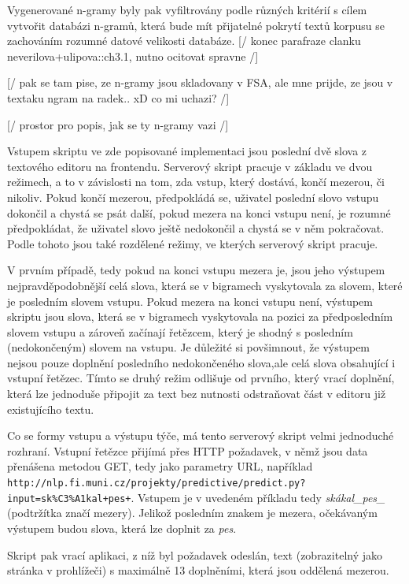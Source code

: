 \documentclass{article}
\begin{document}
Vygenerované n-gramy byly pak vyfiltrovány podle různých kritérií s cílem vytvořit databázi n-gramů, která bude mít přijatelné pokrytí textů korpusu se zachováním rozumné datové velikosti databáze.
[/ konec parafraze clanku neverilova+ulipova::ch3.1, nutno ocitovat spravne /]

[/ pak se tam pise, ze n-gramy jsou skladovany v FSA, ale mne prijde, ze jsou v textaku ngram na radek.. xD co mi uchazi? /]

[/ prostor pro popis, jak se ty n-gramy vazi /]

Vstupem skriptu ve zde popisované implementaci jsou poslední dvě slova z textového editoru na frontendu. Serverový skript pracuje v základu ve dvou režimech, a to v závislosti na tom, zda vstup, který dostává, končí mezerou, či nikoliv. Pokud končí mezerou, předpokládá se, uživatel poslední slovo vstupu dokončil a chystá se psát další, pokud mezera na konci vstupu není, je rozumné předpokládat, že uživatel slovo ještě nedokončil a chystá se v něm pokračovat. Podle tohoto jsou také rozdělené režimy, ve kterých serverový skript pracuje. 

V prvním případě, tedy pokud na konci vstupu mezera je, jsou jeho výstupem nejpravděpodobnější celá slova, která se v bigramech vyskytovala za slovem, které je posledním slovem vstupu. Pokud mezera na konci vstupu není, výstupem skriptu jsou slova, která se v bigramech vyskytovala na pozici za předposledním slovem vstupu a zároveň začínají řetězcem, který je shodný s posledním (nedokončeným) slovem na vstupu. Je důležité si povšimnout, že výstupem nejsou pouze doplnění posledního nedokončeného slova,ale celá slova obsahující i vstupní řetězec. Tímto se druhý režim odlišuje od prvního, který vrací doplnění, která lze jednoduše připojit za text bez nutnosti odstraňovat část v editoru již existujícího textu.

Co se formy vstupu a výstupu týče, má tento serverový skript velmi jednoduché rozhraní. Vstupní řetězce přijímá přes HTTP požadavek, v němž jsou data přenášena metodou GET, tedy jako parametry URL, například {\tt http://nlp.fi.muni.cz/projekty/predictive/predict.py?input=sk\%C3\%A1kal+pes+}. Vstupem je v uvedeném příkladu tedy {\it skákal_pes_} (podtržítka značí mezery). Jelikož posledním znakem je mezera, očekávaným výstupem budou slova, která lze doplnit za {\it pes}. 

Skript pak vrací aplikaci, z níž byl požadavek odeslán, text (zobrazitelný jako stránka v prohlížeči) s maximálně 13 doplněními, která jsou oddělená mezerou.
\end{document}
